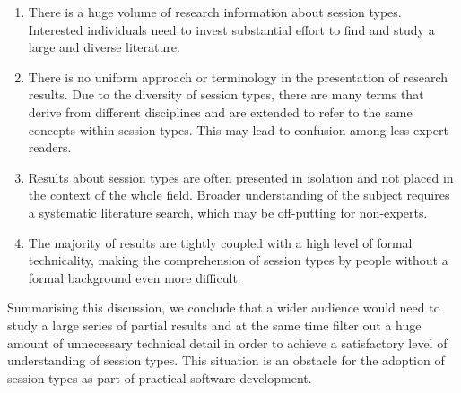 %
\begin{enumerate}
	\item	There is a huge volume of research information about session types.
			Interested individuals need to invest substantial effort to find
			and study a large and diverse literature.

	\item	There is no uniform approach or terminology
			in the presentation of research results.
			Due to the diversity of session types,
			there are many terms that derive from different
			disciplines and are extended to refer to
			the same concepts within session types.
			This may lead to confusion among less
			expert readers.

	\item	%
			Results about session types are often presented in
			isolation and not placed in the context of the whole field.
			Broader understanding of the subject requires a systematic
			literature search, which may be off-putting for non-experts.


	\item	The majority of results are tightly coupled
			with a high level of formal technicality, making the
			comprehension of session types by people without
			a formal background even more difficult.
\end{enumerate}
%
Summarising this discussion, we conclude that a wider
audience would need to study a large series of partial
results and at the same time filter out a huge amount
of unnecessary technical detail in order to achieve a satisfactory
level of understanding of session types. This situation is an obstacle for
the adoption of session types as part of practical software development.

